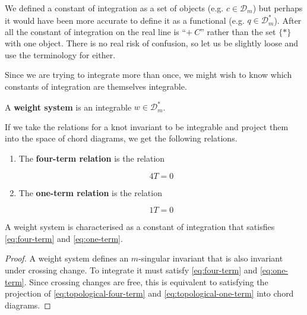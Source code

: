 \begin{remark}
	We defined a constant of integration as a set of objects (e.g. \(c \in \mathcal{D}_{m}\)) but perhaps it would have been more accurate to define it as a functional (e.g. \(q \in \mathcal{D}_{m}^{\ast}\)). After all the constant of integration on the real line is ``\(+ \ C\)'' rather than the set \(\{\ast\}\) with one object. There is no real risk of confusion, so let us be slightly loose and use the terminology for either.
\end{remark}

Since we are trying to integrate more than once, we might wish to know which constants of integration are themselves integrable.

\begin{definition}
	\label{def:weight-system}
	A \textbf{weight system} is an integrable \(w \in \mathcal{D}_{m}^{\ast}\).
\end{definition}

If we take the relations for a knot invariant to be integrable and project them into the space of chord diagrams, we get the following relations.

\begin{definition}
	\label{def:ft-ot-relations}
	\begin{enumerate}
		\item The \textbf{four-term relation} is the relation
			\begin{mdframed}
				\begin{equation}
					\label{eq:four-term}
					\tag{\ft}
					4T = 0
				\end{equation}
			\end{mdframed}

		\item The \textbf{one-term relation} is the relation
			\begin{mdframed}
				\begin{equation}
					\label{eq:one-term}
					\tag{\ot}
					1T = 0
				\end{equation}
			\end{mdframed}
	\end{enumerate}
\end{definition}

\begin{proposition}
	A weight system is characterised as a constant of integration that satisfies \textup{\ref{eq:four-term}} and \textup{\ref{eq:one-term}}.
\end{proposition}
\begin{proof}
	A weight system defines an \(m\)-singular invariant that is also invariant under crossing change. To integrate it must satisfy \ref{eq:four-term}  and \ref{eq:one-term}. Since crossing changes are free, this is equivalent to satisfying the projection of \ref{eq:topological-four-term} and \ref{eq:topological-one-term} into chord diagrams.
\end{proof}




